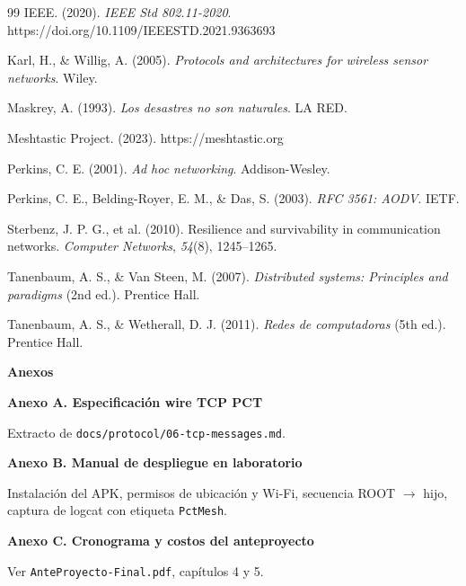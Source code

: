 \documentclass[12pt,letterpaper]{article}
\newcommand{\capitulo}[1]{%
  \par\vspace{0.5\baselineskip}%
  \noindent\textbf{#1}\par
  \vspace{0.35\baselineskip}%
}
\newcommand{\seccion}[1]{%
  \par\vspace{0.45\baselineskip}%
  \noindent\textbf{#1}\par
  \vspace{0.25\baselineskip}%
}
\begin{document}
\begin{thebibliography}{99}
IEEE. (2020). \textit{IEEE Std 802.11-2020}. https://doi.org/10.1109/IEEESTD.2021.9363693

Karl, H., \& Willig, A. (2005). \textit{Protocols and architectures for wireless sensor networks}. Wiley.

Maskrey, A. (1993). \textit{Los desastres no son naturales}. LA RED.

Meshtastic Project. (2023). https://meshtastic.org

Perkins, C. E. (2001). \textit{Ad hoc networking}. Addison-Wesley.

Perkins, C. E., Belding-Royer, E. M., \& Das, S. (2003). \textit{RFC 3561: AODV}. IETF.

Sterbenz, J. P. G., et al. (2010). Resilience and survivability in communication networks. \textit{Computer Networks}, \textit{54}(8), 1245--1265.

Tanenbaum, A. S., \& Van Steen, M. (2007). \textit{Distributed systems: Principles and paradigms} (2nd ed.). Prentice Hall.

Tanenbaum, A. S., \& Wetherall, D. J. (2011). \textit{Redes de computadoras} (5th ed.). Prentice Hall.

\end{thebibliography}

\newpage
\capitulo{Anexos}

\seccion{Anexo A. Especificación wire TCP PCT}
Extracto de \texttt{docs/protocol/06-tcp-messages.md}.

\seccion{Anexo B. Manual de despliegue en laboratorio}
Instalación del APK, permisos de ubicación y Wi-Fi, secuencia ROOT $\rightarrow$ hijo, captura de logcat con etiqueta \texttt{PctMesh}.

\seccion{Anexo C. Cronograma y costos del anteproyecto}
Ver \texttt{AnteProyecto-Final.pdf}, capítulos 4 y 5.
\end{document}
